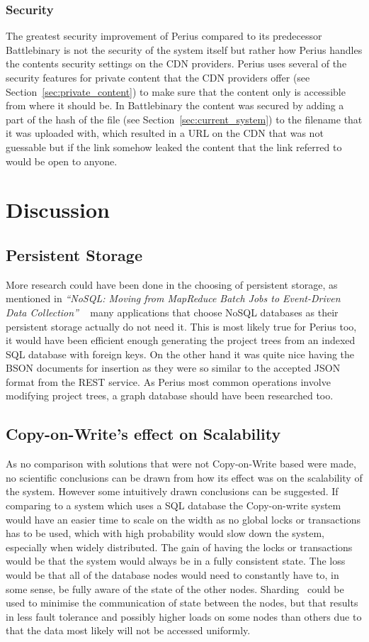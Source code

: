 \documentclass[a4paper,12pt]{article}
\begin{document}
\subsubsection{Security}
The greatest security improvement of Perius compared to its predecessor Battlebinary is not the
security of the system itself but rather how Perius handles the contents security settings on the
CDN providers. Perius uses several of the security features for private content that the CDN
providers offer (see Section~\ref{sec:private_content}) to make sure that the content only is
accessible from where it should be. In Battlebinary the content was secured by adding a part of the
hash of the file (see Section~\ref{sec:current_system}) to the filename that it was uploaded with, 
which resulted in a URL on the CDN that was not guessable but if the link somehow leaked the 
content that the link referred to would be open to anyone.

\newpage
\section{Discussion}
\subsection{Persistent Storage}
More research could have been done in the choosing of persistent storage, as mentioned in 
\textit{``NoSQL: Moving from MapReduce Batch Jobs to Event-Driven Data Collection''}
~\cite{KLINGSBO} many applications that choose NoSQL databases as their persistent storage 
actually do not need it. This is most likely true for Perius too, it would have been efficient 
enough generating the project trees from an indexed SQL database with foreign keys. On the 
other hand it was quite nice having the BSON documents for insertion as they were so similar 
to the accepted JSON format from the REST service. As Perius most common operations involve 
modifying project trees, a graph database should have been researched too.

\subsection{Copy-on-Write's effect on Scalability}
As no comparison with solutions that were not Copy-on-Write based were made, no scientific
conclusions can be drawn from how its effect was on the scalability of the system. However some
intuitively drawn conclusions can be suggested. If comparing to a system which uses a SQL database
the Copy-on-write system would have an easier time to scale on the width as no global locks or
transactions has to be used, which with high probability would slow down the system, especially when
widely distributed.
The gain of having the locks or transactions would be that the system would
always be in a fully consistent state. The loss would be that all of the database nodes would need
to constantly have to, in some sense, be fully aware of the state of the other nodes.
Sharding~\cite{SHARDING} could be used to minimise the communication of state between the nodes, but
that results in less fault tolerance and possibly higher loads on some nodes than others due to that
the data most likely will not be accessed uniformly.
\end{document}
